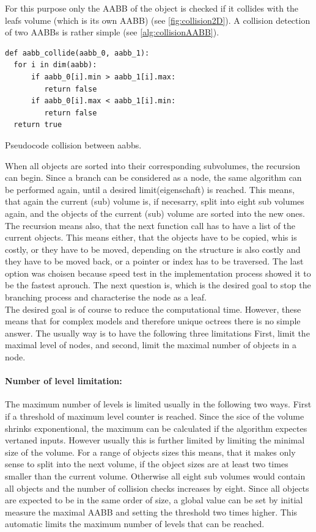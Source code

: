 For this purpose only the \ac{AABB} of the object is checked if it collides with the leafs volume (which is its own \ac{AABB}) (see \cref{fig:collision2D}).
A collision detection of two \ac{AABB}s is rather simple (see \cref{alg:collisionAABB}).
% 
\begin{lstfloat}[!tb]
\lstset{style=python}
\begin{lstlisting}[]
def aabb_collide(aabb_0, aabb_1):
  for i in dim(aabb):
      if aabb_0[i].min > aabb_1[i].max:
         return false
      if aabb_0[i].max < aabb_1[i].min:
         return false
  return true
\end{lstlisting}
\caption{Pseudocode collision between aabbs.}
\label{alg:collisionAABB}
\end{lstfloat}
% 
When all objects are sorted into their corresponding subvolumes, the recursion can begin.
Since a branch can be considered as a node, the same algorithm can be performed again, until a desired limit(eigenschaft) is reached.
This means, that again the current (sub) volume is, if necesarry, split into eight sub volumes again, and the objects of the current (sub) volume are sorted into the new ones.
The recursion means also, that the next function call has to have a list of the current objects.
This means either, that the objects have to be copied, whis is costly, or they have to be moved, depending on the structure is also costly and they have to be moved back, or a pointer or index has to be traversed.
The last option was choisen because speed test in the implementation process showed it to be the fastest aprouch.
The next question is, which is the desired goal to stop the branching process and characterise the node as a leaf.
\\[\baselineskip]
% 
The desired goal is of course to reduce the computational time.
However, these means that for complex models and therefore unique octrees there is no simple answer.
The usually way is to have the following three limitations
First, limit the maximal level of nodes, and second, limit the maximal number of objects in a node.
% 
\paragraph{Number of level limitation:}
The maximum number of levels is limited usually in the following two ways.
First if a threshold of maximum level counter is reached.
Since the sice of the volume shrinks exponentional, the maximum can be calculated if the algorithm expectes vertaned inputs.
However usually this is further limited by limiting the minimal size of the volume.
For a range of objects sizes this means, that it makes only sense to split into the next volume, if the object sizes are at least two times smaller than the current volume.
Otherwise all eight sub volumes would contain all objects and the number of collision checks increases by eight.
Since all objects are expected to be in the same order of size, a global value can be set by initial measure the maximal \ac{AABB} and setting the threshold two times higher.
This automatic limits the maximum number of levels that can be reached.
% 
